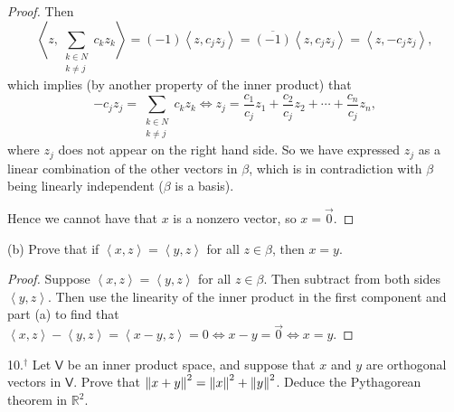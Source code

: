 \documentclass[11pt]{article}
\newcommand{\abr}[1]{\left\langle#1\right\rangle}
\begin{document}
\begin{proof}
  Then $$\abr{z,\sum\limits_{\substack{k\in N \\ k\neq j}}c_kz_k} = (-1)\abr{z,c_jz_j} = \overline{(-1)}\abr{z,c_jz_j} = \abr{z,-c_jz_j},$$ which implies (by another property of the inner product) that $$-c_jz_j = \sum\limits_{\substack{k\in N \\ k\neq j}}c_kz_k \iff z_j = \frac{c_1}{c_j}z_1 + \frac{c_2}{c_j}z_2 + \cdots + \frac{c_n}{c_j}z_n,$$ where $z_j$ does not appear on the right hand side. So we have expressed $z_j$ as a linear combination of the other vectors in $\beta$, which is in contradiction with $\beta$ being linearly independent ($\beta$ is a basis). 
  
  Hence we cannot have that $x$ is a nonzero vector, so $x = \vec{0}$.
\end{proof}

(b) Prove that if $\abr{x,z} = \abr{y,z}$ for all $z\in \beta$, then $x=y$.

\begin{proof}
  Suppose $\abr{x,z} = \abr{y,z}$ for all $z\in \beta$. Then subtract from both sides $\abr{y,z}$. Then use the linearity of the inner product in the first component and part (a) to find that \\ $\abr{x,z} - \abr{y,z} = \abr{x-y,z} = 0 \iff x-y = \vec{0} \iff x=y$. 
\end{proof}

10.$^{\dagger}$ Let $\mathsf{V}$ be an inner product space, and suppose that $x$ and $y$ are orthogonal vectors in $\mathsf{V}$. Prove that $\norm{x+y}^2 = \norm{x}^2 + \norm{y}^2$. Deduce the Pythagorean theorem in $\mathbb{R}^2$.
\end{document}
